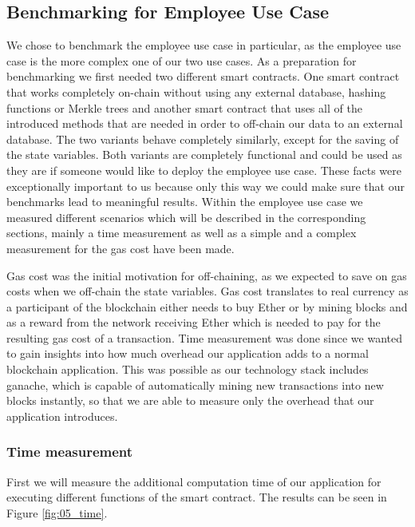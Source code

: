 \subsection{Benchmarking for Employee Use Case}
We chose to benchmark the employee use case in particular, as the employee use case is the more complex one of our two use cases.
As a preparation for benchmarking we first needed two different smart contracts.
One smart contract that works completely on-chain without using any external database, hashing functions or Merkle trees and another smart contract that uses all of the introduced methods that are needed in order to off-chain our data to an external database.
The two variants behave completely similarly, except for the saving of the state variables.
Both variants are completely functional and could be used as they are if someone would like to deploy the employee use case.
These facts were exceptionally important to us because only this way we could make sure that our benchmarks lead to meaningful results.
Within the employee use case we measured different scenarios which will be described in the corresponding sections, mainly a time measurement as well as a simple and a complex measurement for the gas cost have been made.

Gas cost was the initial motivation for off-chaining, as we expected to save on gas costs when we off-chain the state variables.
Gas cost translates to real currency as a participant of the blockchain either needs to buy Ether or by mining blocks and as a reward from the network receiving Ether which is needed to pay for the resulting gas cost of a transaction.
Time measurement was done since we wanted to gain insights into how much overhead our application adds to a normal blockchain application.
This was possible as our technology stack includes ganache, which is capable of automatically mining new transactions into new blocks instantly, so that we are able to measure only the overhead that our application introduces.

\subsubsection{Time measurement}
First we will measure the additional computation time of our application for executing different functions of the smart contract.
The results can be seen in Figure \ref{fig:05_time}.

